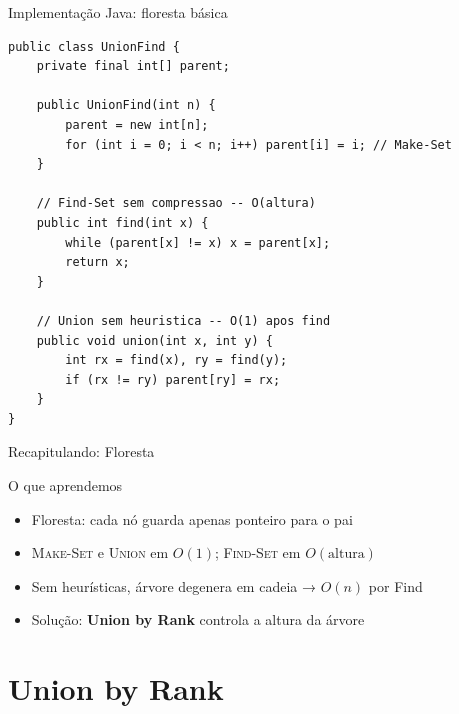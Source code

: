 \documentclass[aspectratio=169]{beamer}
\begin{document}
\begin{frame}[fragile,shrink=15]{Implementação Java: floresta básica}%
\begin{lstlisting}
public class UnionFind {
    private final int[] parent;

    public UnionFind(int n) {
        parent = new int[n];
        for (int i = 0; i < n; i++) parent[i] = i; // Make-Set
    }

    // Find-Set sem compressao -- O(altura)
    public int find(int x) {
        while (parent[x] != x) x = parent[x];
        return x;
    }

    // Union sem heuristica -- O(1) apos find
    public void union(int x, int y) {
        int rx = find(x), ry = find(y);
        if (rx != ry) parent[ry] = rx;
    }
}
\end{lstlisting}
\end{frame}

\begin{frame}{Recapitulando: Floresta}%
  \begin{block}{O que aprendemos}
    \begin{itemize}
      \item Floresta: cada nó guarda apenas ponteiro para o pai
      \item \textsc{Make-Set} e \textsc{Union} em $O(1)$; \textsc{Find-Set} em $O(\text{altura})$
      \item Sem heurísticas, árvore degenera em cadeia → $O(n)$ por Find
      \item Solução: \textbf{Union by Rank} controla a altura da árvore
    \end{itemize}
  \end{block}
\end{frame}

\section{Union by Rank}
\end{document}
